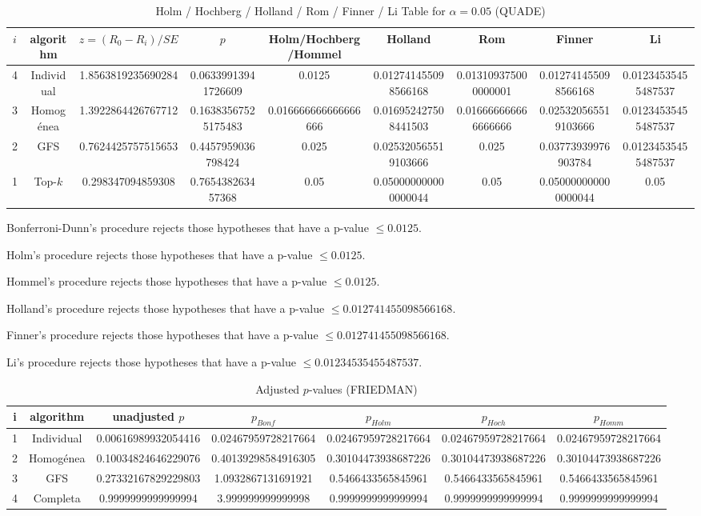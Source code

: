 \documentclass[a4paper,10pt]{article}
\begin{document}
\begin{landscape}
\begin{table}[!htp]
\centering\scriptsize
\caption{Holm / Hochberg / Holland / Rom / Finner / Li Table for $\alpha=0.05$ (QUADE)}
\begin{tabular}{ccccccccc}
$i$&algorithm&$z=(R_0 - R_i)/SE$&$p$&Holm/Hochberg/Hommel&Holland&Rom&Finner&Li\\
\hline
4&Individual&1.8563819235690284&0.06339913941726609&0.0125&0.012741455098566168&0.013109375000000001&0.012741455098566168&0.01234535455487537\\
3&Homogénea&1.3922864426767712&0.16383567525175483&0.016666666666666666&0.016952427508441503&0.016666666666666666&0.025320565519103666&0.01234535455487537\\
2&GFS&0.7624425757515653&0.4457959036798424&0.025&0.025320565519103666&0.025&0.03773939976903784&0.01234535455487537\\
1&Top-$k$&0.298347094859308&0.765438263457368&0.05&0.050000000000000044&0.05&0.050000000000000044&0.05\\
\hline
\end{tabular}
\end{table}
Bonferroni-Dunn's procedure rejects those hypotheses that have a p-value $\le0.0125$.


Holm's procedure rejects those hypotheses that have a p-value $\le0.0125$.


Hommel's procedure rejects those hypotheses that have a p-value $\le0.0125$.


Holland's procedure rejects those hypotheses that have a p-value $\le0.012741455098566168$.


Finner's procedure rejects those hypotheses that have a p-value $\le0.012741455098566168$.


Li's procedure rejects those hypotheses that have a p-value $\le0.01234535455487537$.



\newpage

\begin{table}[!htp]
\centering\scriptsize
\caption{Adjusted $p$-values (FRIEDMAN)}
\begin{tabular}{ccccccc}
i&algorithm&unadjusted $p$&$p_{Bonf}$&$p_{Holm}$&$p_{Hoch}$&$p_{Homm}$\\
\hline
1&Individual&0.00616989932054416&0.02467959728217664&0.02467959728217664&0.02467959728217664&0.02467959728217664\\
2&Homogénea&0.10034824646229076&0.40139298584916305&0.30104473938687226&0.30104473938687226&0.30104473938687226\\
3&GFS&0.27332167829229803&1.0932867131691921&0.5466433565845961&0.5466433565845961&0.5466433565845961\\
4&Completa&0.9999999999999994&3.999999999999998&0.9999999999999994&0.9999999999999994&0.9999999999999994\\
\hline
\end{tabular}
\end{table}


\end{landscape}
\end{document}
